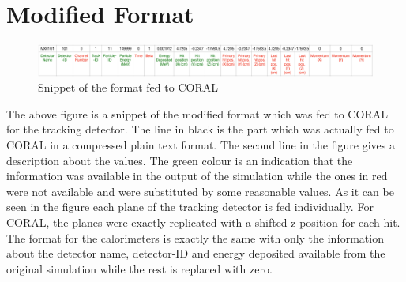 \chapter{Modified Format}
\label{sec:app_2}
\begin{figure}[h!]
\centering
\includegraphics[width=18cm]{thesis_figures/TGEANT_format.pdf}
\caption{Snippet of the format fed to CORAL}
\label{fig:Format}
\end{figure}

The above figure is a snippet of the modified format which was fed to CORAL for the tracking detector. The line in black is the part which was actually fed to CORAL in a compressed plain text format. The second line in the figure gives a description about the values. The green colour is an indication that the information was available in the output of the simulation while the ones in red were not available and were substituted by some reasonable values. As it can be seen in the figure each plane of the tracking detector is fed individually. For CORAL, the planes were exactly replicated with a shifted z position for each hit. 
The format for the calorimeters is exactly the same with only the information about the detector name, detector-ID and energy deposited available from the original simulation while the rest is replaced with zero.
